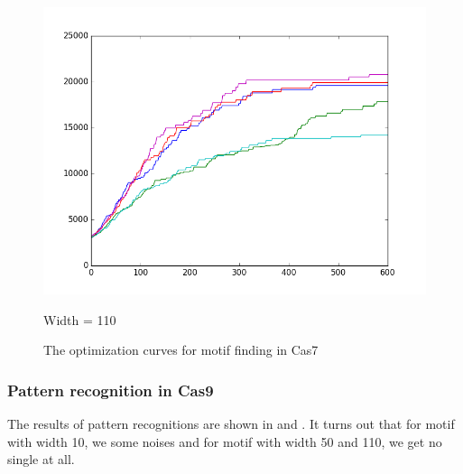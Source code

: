 \documentclass[11pt, oneside]{article}
\begin{document}
\begin{figure}[htbp]
\begin{minipage}{0.32\textwidth}
    \includegraphics[width=1\textwidth]{images/cas7_width110_curve} %
    \caption*{Width = 110}
  \end{minipage}
  \caption{The optimization curves for motif finding in Cas7}
  \label{fig:cas7}
\end{figure}

\subsubsection{Pattern recognition in Cas9}

The results of pattern recognitions are shown in  and . It turns out that for motif with width 10, we some noises and for motif with width 50 and 110, we get no single at all.
\end{document}
